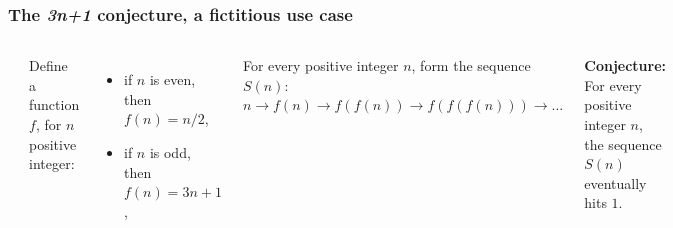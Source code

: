 \documentclass[english,serif,mathserif,xcolor=pdftex,dvipsnames,table]{beamer}
\begin{document}
  \begin{frame}
    \frametitle{The \emph{3n+1} conjecture, a fictitious use case}
    \label{sec:7a}

    \+
    \begin{columns}[c]
      \includegraphics[height=0.8\textheight]{fig/3n+1}

      Define a function $f$, for $n$ positive integer:
      \begin{itemize}
      \item if $n$ is even, then $f(n) = n / 2$,
      \item if $n$ is odd, then $f(n) = 3n+1$,
      \end{itemize}

      \+
      For every positive integer $n$, form the sequence $S(n)$:
      $n \to f(n) \to f(f(n)) \to f(f(f(n))) \to \ldots$

      \+
      \textbf{Conjecture:} For every positive integer $n$, the sequence $S(n)$
      eventually hits $1$.
    \end{columns}
  \end{frame}
\end{document}
